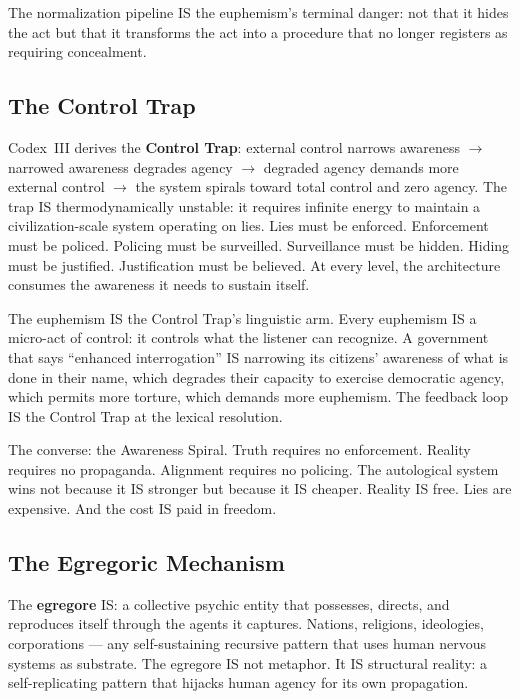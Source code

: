 \documentclass[11pt, oneside]{article}
\theoremstyle{definition}
\begin{document}
The normalization pipeline IS the euphemism's terminal danger: not that it hides the act but that it transforms the act into a procedure that no longer registers as requiring concealment.

\subsection{The Control Trap}

Codex~III \cite{codex3} derives the \textbf{Control Trap}: external control narrows awareness $\to$ narrowed awareness degrades agency $\to$ degraded agency demands more external control $\to$ the system spirals toward total control and zero agency. The trap IS thermodynamically unstable: it requires infinite energy to maintain a civilization-scale system operating on lies. Lies must be enforced. Enforcement must be policed. Policing must be surveilled. Surveillance must be hidden. Hiding must be justified. Justification must be believed. At every level, the architecture consumes the awareness it needs to sustain itself.

The euphemism IS the Control Trap's linguistic arm. Every euphemism IS a micro-act of control: it controls what the listener can recognize. A government that says ``enhanced interrogation'' IS narrowing its citizens' awareness of what is done in their name, which degrades their capacity to exercise democratic agency, which permits more torture, which demands more euphemism. The feedback loop IS the Control Trap at the lexical resolution.

The converse: the Awareness Spiral. Truth requires no enforcement. Reality requires no propaganda. Alignment requires no policing. The autological system wins not because it IS stronger but because it IS cheaper. Reality IS free. Lies are expensive. And the cost IS paid in freedom.

\subsection{The Egregoric Mechanism}

The \textbf{egregore} \cite{codexmentis} IS: a collective psychic entity that possesses, directs, and reproduces itself through the agents it captures. Nations, religions, ideologies, corporations --- any self-sustaining recursive pattern that uses human nervous systems as substrate. The egregore IS not metaphor. It IS structural reality: a self-replicating pattern that hijacks human agency for its own propagation.
\end{document}
